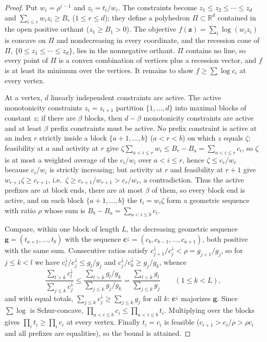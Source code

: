 \documentclass[11pt]{article}
\theoremstyle{definition}
\theoremstyle{remark}
\newcommand{\R}{\mathbb{R}}
\newcommand{\vct}[1]{\mathbf{#1}}
\begin{document}
\begin{proof}
Put $w_i=\rho^{i-1}$ and $z_i=t_i/w_i$.  The constraints become
$z_1\leq z_2\leq\cdots\leq z_d$ and $\sum_{i\leq r}w_iz_i\geq B_r$
($1\leq r\leq d$); they define a polyhedron $\Pi\subset\R^d$ contained in
the open positive orthant ($z_1\geq B_1>0$).  The objective
$f(\vct{z})=\sum_i\log(w_iz_i)$ is concave on $\Pi$ and nondecreasing in
every coordinate, and the recession cone of $\Pi$,
$\{0\leq z_1\leq\cdots\leq z_d\}$, lies in the nonnegative orthant.
$\Pi$ contains no line, so every point of $\Pi$ is a convex combination of
vertices plus a recession vector, and $f$ is at least its minimum over the
vertices.  It remains to show $f\geq\sum\log c_i$ at every vertex.

At a vertex, $d$ linearly independent constraints are active.  The active
monotonicity constraints $z_i=z_{i+1}$ partition $\{1,\ldots,d\}$ into
maximal blocks of constant $z$; if there are $\beta$ blocks, then
$d-\beta$ monotonicity constraints are active and at least $\beta$ prefix
constraints must be active.  No prefix constraint is active at an index
$r$ strictly inside a block $\{a+1,\ldots,b\}$ ($a<r<b$) on which $z$
equals $\zeta$: feasibility at $a$ and activity at $r$ give
$\zeta\sum_{a<i\leq r}w_i\leq B_r-B_a=\sum_{a<i\leq r}c_i$, so $\zeta$
is at most a weighted average of the $c_i/w_i$ over $a<i\leq r$, hence
$\zeta\leq c_r/w_r$ because $c_i/w_i$ is strictly increasing; but
activity at $r$ and feasibility at $r+1$ give $w_{r+1}\zeta\geq c_{r+1}$,
i.e.\ $\zeta\geq c_{r+1}/w_{r+1}>c_r/w_r$, a contradiction.  Thus the
active prefixes are at block ends, there are at most $\beta$ of them, so
every block end is active, and on each block $\{a+1,\ldots,b\}$ the
$t_i=w_i\zeta$ form a geometric sequence with ratio $\rho$ whose sum is
$B_b-B_a=\sum_{a<i\leq b}c_i$.

Compare, within one block of length $L$, the decreasing geometric
sequence $\vct{g}=(t_{a+1},\ldots,t_b)$ with the sequence
$\vct{c}^{\downarrow}=(c_b,c_{b-1},\ldots,c_{a+1})$, both positive with
the same sum.  Consecutive ratios satisfy
$c^{\downarrow}_{j+1}/c^{\downarrow}_j<\rho=g_{j+1}/g_j$, so for $j\leq
k<l$ we have $c^{\downarrow}_l/c^{\downarrow}_j\leq g_l/g_j$ and
$c^{\downarrow}_j/c^{\downarrow}_k\geq g_j/g_k$, whence
\[
  \frac{\sum_{l>k}c^{\downarrow}_l}{\sum_{j\leq k}c^{\downarrow}_j}
  \leq\frac{\sum_{l>k}g_l/g_k}{\sum_{j\leq k}g_j/g_k}
  =\frac{\sum_{l>k}g_l}{\sum_{j\leq k}g_j}
  \qquad(1\leq k<L),
\]
and with equal totals, $\sum_{j\leq k}c^{\downarrow}_j\geq\sum_{j\leq
k}g_j$ for all $k$: $\vct{c}^{\downarrow}$ majorizes $\vct{g}$.  Since
$\sum\log$ is Schur-concave, $\prod_{a<i\leq b}c_i\leq\prod_{a<i\leq
b}t_i$.  Multiplying over the blocks gives $\prod_it_i\geq\prod_ic_i$ at
every vertex.  Finally $t_i=c_i$ is feasible ($c_{i+1}>c_i/\rho>\rho
c_i$ and all prefixes are equalities), so the bound is attained.
\end{proof}
\end{document}
